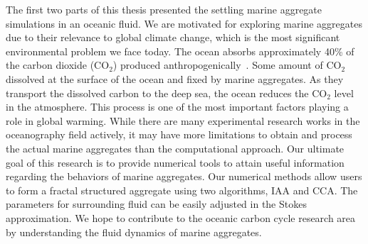 %   

The first two parts of this thesis presented the settling marine aggregate simulations in an oceanic fluid. 
We are motivated for exploring marine aggregates due to their relevance to global climate change, which is the most significant environmental problem we face today.
The ocean absorbs approximately 40\% of the carbon dioxide (CO$_2$) produced anthropogenically~\cite{omand_sinking_2020}. 
Some amount of CO$_2$ dissolved at the surface of the ocean and fixed by marine aggregates. As they transport the dissolved carbon to the deep sea, the ocean reduces the CO$_2$ level in the atmosphere. 
This process is one of the most important factors playing a role in global warming.
While there are many experimental research works in the oceanography field actively, it may have more limitations to obtain and process the actual marine aggregates than the computational approach. Our ultimate goal of this research is to provide numerical tools to attain useful information regarding the behaviors of marine aggregates.  
Our numerical methods allow users to form a fractal structured aggregate using two algorithms, IAA and CCA. The parameters for surrounding fluid can be easily adjusted in the Stokes approximation. 
We hope to contribute to the oceanic carbon cycle research area by understanding the fluid dynamics of marine aggregates. 



